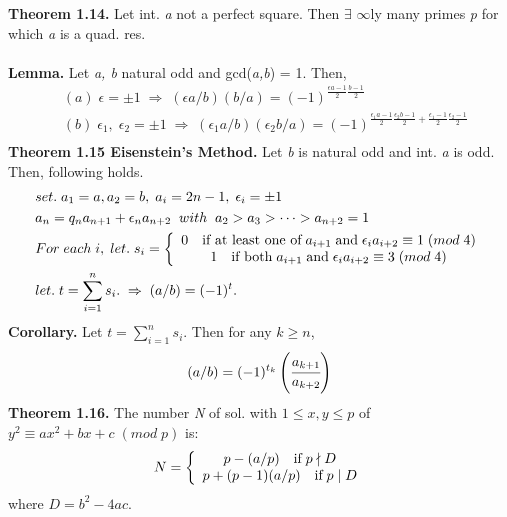 \documentclass[a4paper,10pt]{article}
\begin{document}
\textbf{Theorem 1.14.} Let int. \textit{a} not a perfect square. Then $\exists$ $\infty$ly many primes \textit{p} for which \textit{a} is a quad. res. \\ \\
\textbf{Lemma.} Let \textit{a, \; b} natural odd and gcd(\textit{a,b}) = 1. Then,
\begin{align}
&(a) \; \epsilon = \pm 1 \; \Rightarrow \; (\epsilon a/b)(b/a) = (-1)^{\frac{\epsilon a-1}{2}\frac{b-1}{2}} \\
&(b) \; \epsilon_{1}, \; \epsilon_{2} = \pm 1 \; \Rightarrow \; (\epsilon_{1} a/b)(\epsilon_{2} b/a) = (-1)^{\frac{\epsilon_{1} a-1}{2}\frac{\epsilon_{2} b-1}{2}+\frac{\epsilon_{1}-1}{2}\frac{\epsilon_{2}-1}{2}} \\
\end{align}
\newpage
\textbf{Theorem 1.15 Eisenstein's Method.} Let \textit{b} is natural odd and int. \textit{a} is odd. Then, following holds.
\begin{align}
&set. \; a_{1}=a, a_{2}=b, \; a_{i}=2n-1,\; \epsilon_{i} = \pm 1 \\
&a_{n} = q_{n}a_{n+1}+\epsilon_{n}a_{n+2} \; \; with \; \; a_{2} > a_{3} > \cdots > a_{n+2} = 1 \\
&For \;each \; i, \; let. \; s_{i} = \left \{ \begin{array}{cc} 0 \quad \textnormal{if at least one of} \; a_{i+1} \; \textnormal{and} \; \epsilon_{i}a_{i+2} \equiv 1 \; (mod \; 4) \\ 1 \quad \textnormal{if both} \; a_{i+1} \; \textnormal{and} \; \epsilon_{i}a_{i+2} \equiv 3 \; (mod \; 4)\end{array} \right. \\
&let. \; t = \sum^{n}_{i=1}s_{i}. \; \Rightarrow \; (a/b) = (-1)^{t}.
\end{align}
\textbf{Corollary.} Let \; $t = \sum^{n}_{i=1}s_{i}$. Then for any \textit{$k \geq n$},
\begin{align}
(a/b) = (-1)^{t_{k}}\left(\cfrac{a_{k+1}}{a_{k+2}}\right)
\end{align}
\textbf{Theorem 1.16.} The number \textit{N} of sol. with $1\leq x, y \leq p$ \; of \; $y^{2} \equiv ax^{2}+bx+c \; (mod \; p)$ is:
\begin{align}
N = \left \{ \begin{array}{cc} p-(a/p) \quad \textnormal{if} \; p\nmid D  \\ p+(p-1)(a/p) \quad \textnormal{if} \; p \mid D \end{array} \right.
\end{align}
where $D=b^{2}-4ac$. \\ \\
\end{document}
